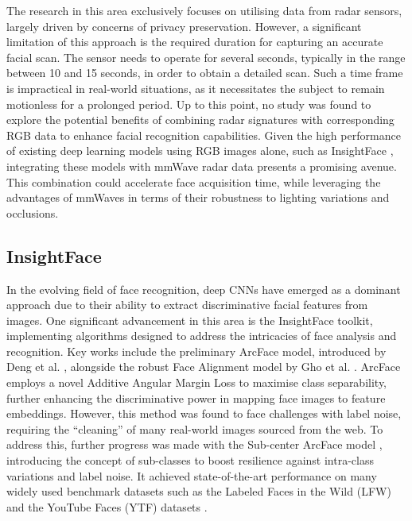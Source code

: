 \documentclass{mpaper}
\begin{document}
The research in this area exclusively focuses on utilising data from radar sensors, largely driven by concerns of privacy preservation. However, a significant limitation of this approach is the required duration for capturing an accurate facial scan. The sensor needs to operate for several seconds, typically in the range between 10 and 15 seconds, in order to obtain a detailed scan. Such a time frame is impractical in real-world situations, as it necessitates the subject to remain motionless for a prolonged period. Up to this point, no study was found to explore the potential benefits of combining radar signatures with corresponding RGB data to enhance facial recognition capabilities. Given the high performance of existing deep learning models using RGB images alone, such as InsightFace \cite{deng2018arcface}, integrating these models with mmWave radar data presents a promising avenue. This combination could accelerate face acquisition time, while leveraging the advantages of mmWaves in terms of their robustness to lighting variations and occlusions.


\subsection{InsightFace}
\label{background:insightface}
In the evolving field of face recognition, deep CNNs have emerged as a dominant approach due to their ability to extract discriminative facial features from images. One significant advancement in this area is the InsightFace toolkit, implementing algorithms designed to address the intricacies of face analysis and recognition. Key works include the preliminary ArcFace model, introduced by Deng et al. \cite{deng2018arcface}, alongside the robust Face Alignment model by Gho et al. \cite{guo2018stacked}. ArcFace employs a novel Additive Angular Margin Loss to maximise class separability, further enhancing the discriminative power in mapping face images to feature embeddings. However, this method was found to face challenges with label noise, requiring the ``cleaning'' of many real-world images sourced from the web. To address this, further progress was made with the Sub-center ArcFace model \cite{deng2020subcenter}, introducing the concept of sub-classes to boost resilience against intra-class variations and label noise. It achieved state-of-the-art performance on many widely used benchmark datasets such as the Labeled Faces in the Wild (LFW) \cite{huang2008labeled} and the YouTube Faces (YTF) datasets \cite{wolf2011face}.
\end{document}
